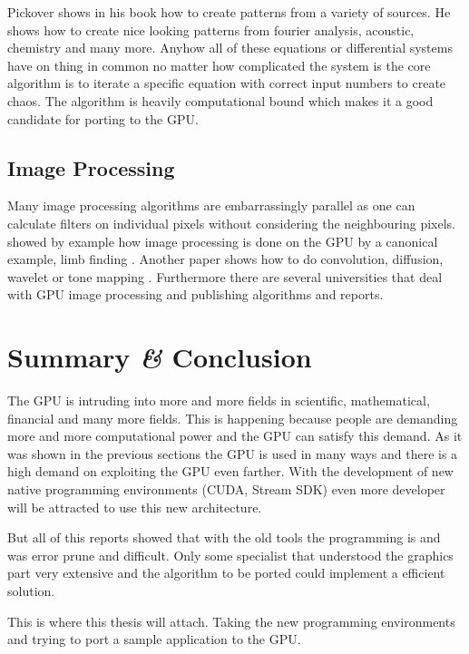 Pickover shows in his book \citep{citeulike:3812233} how to create patterns from
a variety of sources. He shows how to create nice looking patterns from fourier
analysis, acoustic, chemistry and many more. Anyhow all of these equations or
differential systems have on thing in common no matter how complicated the
system is the core algorithm is to iterate a specific equation with correct
input numbers to create chaos. The algorithm is heavily computational bound
which makes it a good candidate for porting to the \gls{GPU}.


\subsection{Image Processing}
Many image processing algorithms are embarrassingly parallel as one can calculate
filters on individual pixels without considering the neighbouring pixels. 
 showed by example how image processing is done
on the \gls{GPU} by a canonical example, limb finding \citep{citeulike:6661950}. 
Another paper shows how to do convolution, diffusion, wavelet or tone mapping
\citep{citeulike:6661954}. Furthermore there are several universities that
deal with \gls{GPU} image processing and publishing algorithms and reports. 


\section{Summary {\textit{\&}} Conclusion} %
\label{sec:summary_conclusion}
The \gls{GPU} is intruding into more and more fields in scientific, mathematical, 
financial and many more fields. This is happening because people are demanding
more and more computational power and the \gls{GPU} can satisfy  this demand. 
As it was shown in the previous sections the \gls{GPU} is used in many ways and
there is a high demand on exploiting the \gls{GPU} even farther. With the development
of new native programming environments (\gls{CUDA}, Stream \gls{SDK}) even more
developer will be attracted to use this new architecture. 

But all of this reports showed that with the old tools the programming is and was
error prune and difficult. Only some specialist that understood the graphics part
very extensive and the algorithm to be ported could implement a efficient solution. 

This is where this thesis will attach. Taking the new programming environments
and trying to port a sample application to the \gls{GPU}. 










